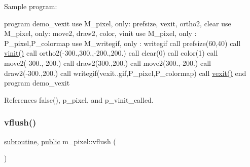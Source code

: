 Sample program\+:

program demo\+\_\+vexit use M\+\_\+pixel, only\+: prefsize, vexit, ortho2, clear use M\+\_\+pixel, only\+: move2, draw2, color, vinit use M\+\_\+pixel, only \+: P\+\_\+pixel,P\+\_\+colormap use M\+\_\+writegif, only \+: writegif call prefsize(60,40) call \hyperlink{namespacem__pixel_ac03ca8f23fdadb60599b6ea4dc87a6d9}{vinit()} call ortho2(-\/300.,300.,-\/200.,200.) call clear(0) call color(1) call move2(-\/300.,-\/200.) call draw2(300.,200.) call move2(300.,-\/200.) call draw2(-\/300.,200.) call writegif(\textquotesingle{}vexit..\+gif\textquotesingle{},P\+\_\+pixel,P\+\_\+colormap) call \hyperlink{namespacem__pixel_a19ad6b65752322b0029a62cc0ebec3e8}{vexit()} end program demo\+\_\+vexit 

References false(), p\+\_\+pixel, and p\+\_\+vinit\+\_\+called.

\mbox{\label{namespacem__pixel_ae74cf11194379dbf13069a61b06589a2}} 
\subsubsection{\texorpdfstring{vflush()}{vflush()}}
{\footnotesize\ttfamily \hyperlink{M__stopwatch_83_8txt_acfbcff50169d691ff02d4a123ed70482}{subroutine}, \hyperlink{M__stopwatch_83_8txt_a2f74811300c361e53b430611a7d1769f}{public} m\+\_\+pixel\+::vflush (\begin{DoxyParamCaption}{ }\end{DoxyParamCaption})}

\mbox{\label{namespacem__pixel_a43247343cd316e3aa075b44b5166e2e9}} 

